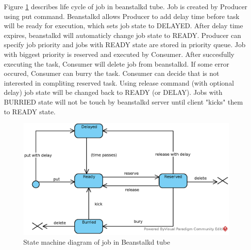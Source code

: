     Figure \ref{fig:beanstalkdJobSM} describes life cycle of job in beanstalkd tube. Job is created by Producer using put command. Beanstalkd allows Producer to add delay time before task will be ready for execution, which sets job state to DELAYED. After delay time expires, beanstalkd will automaticly change job state to READY. Producer can specify job priority and jobs with READY state are stored in priority queue. Job with biggest priority is reserved and executed by Consumer. After succesfully executing the task, Consumer will delete job from beanstalkd. If some error occured, Consumer can burry the task. Consumer can decide that is not interested in compliting reserved task. Using release command (with optional delay) job state will be changed back to READY (or DELAY).
    Jobs with BURRIED state will not be touch by beanstalkd server until client "kicks" them to READY state.

    \begin{figure}[hbt]
        \centering
        \includegraphics[width=1\textwidth]{obrazky-figures/beanstalkd-job-states.eps}
        \caption{State machine diagram of job in Beanstalkd tube}
        \label{fig:beanstalkdJobSM}
    \end{figure}


